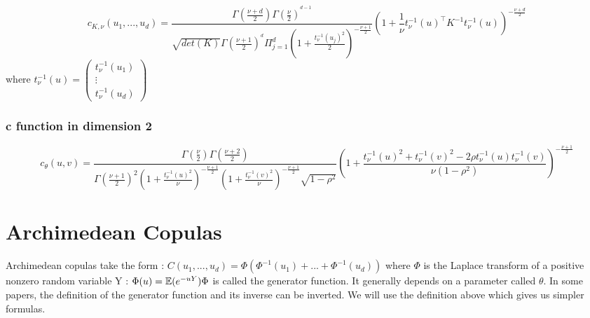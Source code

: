 \documentclass{article}
\begin{document}
	\begin{equation*}
	 c_{K,\nu} (u_{1},...,u_{d}) = \frac{\Gamma (\frac{\nu +d}{2}) \Gamma (\frac{\nu}{2})^{^{d-1}}}{\sqrt{det(K)}\Gamma (\frac{\nu +1}{2})^{^{d}}\Pi_{j=1}^d (1+\frac{t_\nu^{-1}(u_{j})^2}{2})^{-\frac{\nu+1}{2}}}\left(1+\frac{1}{\nu}t_\nu^{-1}(u)^\top K^{-1} t_\nu^{-1}(u) \right)^{-\frac{\nu +d}{2}}
	\end{equation*}
	\newline
	 where \begin{math} t_\nu^{-1}(u) =  \begin{pmatrix}
   t_\nu^{-1}(u_{1}) \\
  \vdots   \\
   t_\nu^{-1}(u_{d})
 \end{pmatrix}\end{math}
	\subsubsection{c function in dimension 2}

	\begin{equation*}
		c_\theta (u,v) = \frac{\Gamma (\frac{\nu}{2})\Gamma (\frac{\nu +2}{2})}{\Gamma(\frac{\nu+1}{2})^2 (1+\frac{t_\nu^{-1} (u)^2}{\nu})^{-\frac{\nu+1}{2}} (1+\frac{t_\nu^{-1} (v)^2}{\nu})^{-\frac{\nu+1}{2}} \sqrt{ 1-\rho^2} } \left(1 + \frac{t_\nu^{-1} (u)^2 + t_\nu^{-1} (v)^2 - 2 \rho t_\nu^{-1} (u) t_\nu^{-1} (v)}{\nu (1-\rho^2)}\right)^{-\frac{\nu +1}{2}}
	\end{equation*}


   \section{Archimedean Copulas}
   Archimedean copulas take the form :
   \newline
   \newline
   \begin{math}
   C(u_{1},...,u_{d})= \Phi(\Phi^{-1}(u_{1})+...+\Phi^{-1}(u_{d}))
   \end{math}
   \newline
   \newline
   where \begin{math} \Phi \end{math} is the Laplace transform of a positive nonzero random variable Y :
	\begin{math} \Phi (u)=\mathbb{E}(e^{-uY})
	\newline
	\newline
	\Phi \end{math} is called the generator function.
	\newline
	It generally depends on a parameter called \begin{math} \theta \end{math}.
	\newline
	In some papers, the definition of the generator function and its inverse can be inverted. We will use the definition above which gives us simpler formulas.
	\newline
\end{document}
